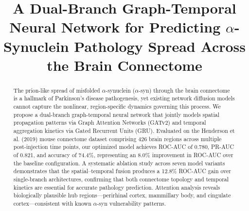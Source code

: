 \documentclass[conference]{IEEEtran}
\begin{document}
\title{A Dual-Branch Graph-Temporal Neural Network for Predicting $\alpha$-Synuclein Pathology Spread Across the Brain Connectome}

\author{
\and
{}
\and
{}
}

\maketitle

\begin{abstract}
The prion-like spread of misfolded $\alpha$-synuclein ($\alpha$-syn) through the brain connectome is a hallmark of Parkinson's disease pathogenesis, yet existing network diffusion models cannot capture the nonlinear, region-specific dynamics governing this process. We propose a dual-branch graph-temporal neural network that jointly models spatial propagation patterns via Graph Attention Networks (GATv2) and temporal aggregation kinetics via Gated Recurrent Units (GRU). Evaluated on the Henderson et al. (2019) mouse connectome dataset comprising 426 brain regions across multiple post-injection time points, our optimized model achieves ROC-AUC of 0.780, PR-AUC of 0.821, and accuracy of 74.4\%, representing an 8.0\% improvement in ROC-AUC over the baseline configuration. A systematic ablation study across seven model variants demonstrates that the spatial--temporal fusion produces a 12.8\% ROC-AUC gain over single-branch architectures, confirming that both connectome topology and temporal kinetics are essential for accurate pathology prediction. Attention analysis reveals biologically plausible hub regions—perirhinal cortex, mammillary body, and cingulate cortex—consistent with known $\alpha$-syn vulnerability patterns.
\end{abstract}
\end{document}
